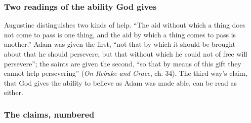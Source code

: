 \documentclass[11pt]{article}
\begin{document}
\subsubsection*{Two readings of the ability God gives}
Augustine distinguishes two kinds of help. “The aid without which a thing does not come to pass is one thing, and the aid by which a thing comes to pass is another.” Adam was given the first, “not that by which it should be brought about that he should persevere, but that without which he could not of free will persevere”; the saints are given the second, “so that by means of this gift they cannot help persevering” (\emph{On Rebuke and Grace}, ch. 34). The third way’s claim, that God gives the ability to believe as Adam was made able, can be read as either.

\subsubsection*{The claims, numbered}
\end{document}
